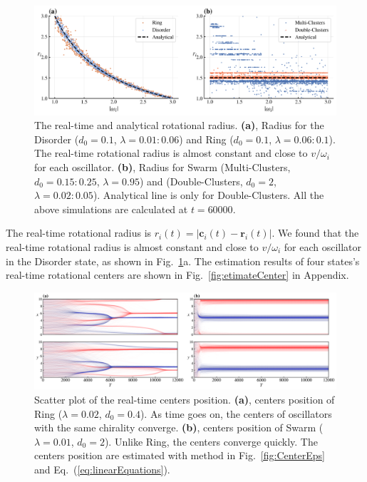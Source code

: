 \documentclass[%
 aip,
 amsmath,amssymb,
 reprint,%
]{revtex4-1}
\begin{document}
\begin{figure}
    \includegraphics[width=\textwidth]{./figs/radiusOmega.png}
    \caption{
        \label{fig:radiusOmega} The real-time and analytical rotational radius.
        \textbf{(a)}, Radius for the Disorder ($d_0=0.1$, $\lambda=0.01:0.06$) and Ring ($d_0=0.1$, $\lambda=0.06:0.1$). The real-time rotational radius is almost constant and close to $v/\omega_i$ for each oscillator. 
        \textbf{(b)}, Radius for Swarm (Multi-Clusters, $d_0=0.15:0.25$, $\lambda=0.95$) and (Double-Clusters, $d_0=2$, $\lambda=0.02:0.05$). Analytical line is only for Double-Clusters.
        All the above simulations are calculated at $t=60000$. 
    }
\end{figure}

The real-time rotational radius is $r_i(t)=\left| \mathbf{c}_i(t)-\mathbf{r}_i(t) \right|$. We found that the real-time rotational radius is almost constant and close to $v/\omega_i$ for each oscillator in the Disorder state, as shown in Fig.~\ref{fig:radiusOmega}a. The estimation results of four states's real-time rotational centers are shown in Fig.~\ref{fig:etimateCenter} in Appendix.

\begin{figure}
    \includegraphics[width=\textwidth]{./figs/centersPosition.png}
    \caption{
        \label{fig:centersPosition} Scatter plot of the real-time centers position. 
        \textbf{(a)}, centers position of Ring ($\lambda=0.02$, $d_0=0.4$). As time goes on, the centers of oscillators with the same chirality converge.
        \textbf{(b)}, centers position of Swarm ($\lambda=0.01$, $d_0=2$). Unlike Ring, the centers converge quickly.
        The centers position are estimated with method in Fig.~\ref{fig:CenterEps} and Eq.~(\ref{eq:linearEquations}).
    }
\end{figure}
\end{document}
